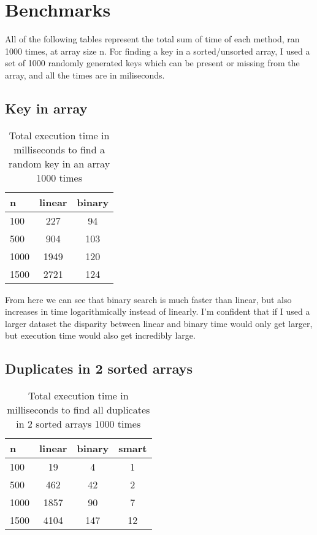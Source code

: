 \documentclass[a4paper,11pt]{article}
\begin{document}
\section*{Benchmarks}
All of the following tables represent the total sum of time of each method, ran 1000 times, at array size n. For finding a key in a sorted/unsorted array, I used a set of 1000 randomly generated keys which can be present or missing from the array, and all the times are in miliseconds. 

\subsection*{Key in array}
\begin{table}[h]
\begin{center}
\begin{tabular}{l|c|c}
\textbf{n} & \textbf{linear} & \textbf{binary}\\
\hline
100 &227 &94 \\
500 &904 &103\\
1000 &1949 &120\\
1500 &2721 &124\\
\end{tabular}
\caption{Total execution time in milliseconds to find a random key in an array 1000 times}
\label{tab:table1}
\end{center}
\end{table}

From here we can see that binary search is much faster than linear, but also increases in time logarithmically instead of linearly. I'm confident that if I used a larger dataset the disparity between linear and binary time would only get larger, but execution time would also get incredibly large.

\subsection*{Duplicates in 2 sorted arrays}
\begin{table}[h]
\begin{center}
\begin{tabular}{l|c|c|c}
\textbf{n} & \textbf{linear} & \textbf{binary} & \textbf{smart}\\
\hline
100&19&4&1\\
500&462&42&2\\
1000&1857&90&7\\
1500&4104&147&12\\
\end{tabular}
\caption{Total execution time in milliseconds to find all duplicates in 2 sorted arrays 1000 times}
\label{tab:table1}
\end{center}
\end{table}
\end{document}
